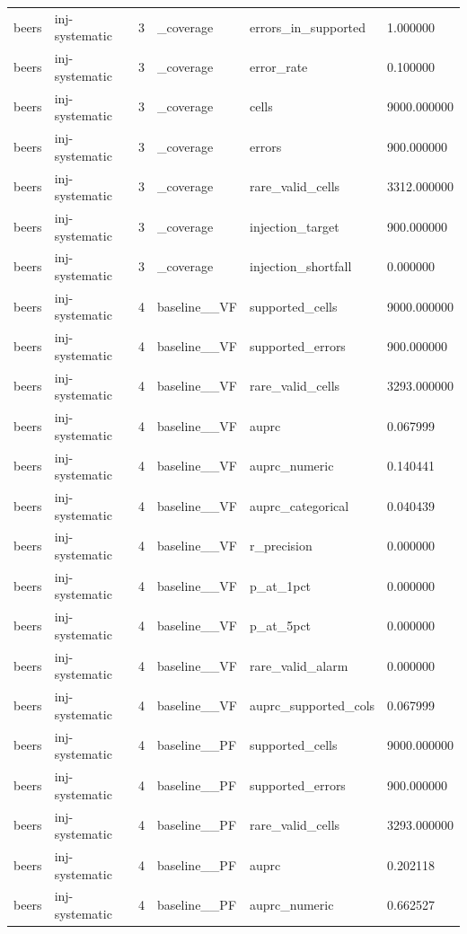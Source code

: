 \begin{tabular}{llllll}
beers & inj-systematic & 3 & \_coverage & errors\_in\_supported & 1.000000 \\
beers & inj-systematic & 3 & \_coverage & error\_rate & 0.100000 \\
beers & inj-systematic & 3 & \_coverage & cells & 9000.000000 \\
beers & inj-systematic & 3 & \_coverage & errors & 900.000000 \\
beers & inj-systematic & 3 & \_coverage & rare\_valid\_cells & 3312.000000 \\
beers & inj-systematic & 3 & \_coverage & injection\_target & 900.000000 \\
beers & inj-systematic & 3 & \_coverage & injection\_shortfall & 0.000000 \\
beers & inj-systematic & 4 & baseline\_\_VF & supported\_cells & 9000.000000 \\
beers & inj-systematic & 4 & baseline\_\_VF & supported\_errors & 900.000000 \\
beers & inj-systematic & 4 & baseline\_\_VF & rare\_valid\_cells & 3293.000000 \\
beers & inj-systematic & 4 & baseline\_\_VF & auprc & 0.067999 \\
beers & inj-systematic & 4 & baseline\_\_VF & auprc\_numeric & 0.140441 \\
beers & inj-systematic & 4 & baseline\_\_VF & auprc\_categorical & 0.040439 \\
beers & inj-systematic & 4 & baseline\_\_VF & r\_precision & 0.000000 \\
beers & inj-systematic & 4 & baseline\_\_VF & p\_at\_1pct & 0.000000 \\
beers & inj-systematic & 4 & baseline\_\_VF & p\_at\_5pct & 0.000000 \\
beers & inj-systematic & 4 & baseline\_\_VF & rare\_valid\_alarm & 0.000000 \\
beers & inj-systematic & 4 & baseline\_\_VF & auprc\_supported\_cols & 0.067999 \\
beers & inj-systematic & 4 & baseline\_\_PF & supported\_cells & 9000.000000 \\
beers & inj-systematic & 4 & baseline\_\_PF & supported\_errors & 900.000000 \\
beers & inj-systematic & 4 & baseline\_\_PF & rare\_valid\_cells & 3293.000000 \\
beers & inj-systematic & 4 & baseline\_\_PF & auprc & 0.202118 \\
beers & inj-systematic & 4 & baseline\_\_PF & auprc\_numeric & 0.662527 \\

\end{tabular}
